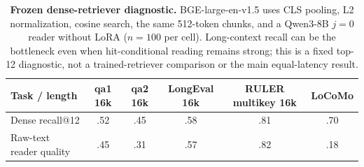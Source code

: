 \begin{table}[t]
\centering
\scriptsize
\setlength{\tabcolsep}{3.2pt}
\begin{tabular}{@{}lccccc@{}}
\toprule
\textbf{Task / length} & \textbf{qa1 16k} & \textbf{qa2 16k} &
\textbf{LongEval 16k} & \textbf{RULER multikey 16k} & \textbf{LoCoMo} \\
\midrule
Dense recall@12 & .52 & .45 & .58 & .81 & .70 \\
Raw-text reader quality & .45 & .31 & .57 & .82 & .18 \\
\bottomrule
\end{tabular}
\caption{\textbf{Frozen dense-retriever diagnostic.} BGE-large-en-v1.5 uses
CLS pooling, L2 normalization, cosine search, the same 512-token chunks, and a
Qwen3-8B $j{=}0$ reader without LoRA ($n{=}100$ per cell). Long-context recall
can be the bottleneck even when hit-conditional reading remains strong; this is
a fixed top-12 diagnostic, not a trained-retriever comparison or the main
equal-latency result.}
\label{tab:dense-retriever}
\end{table}

